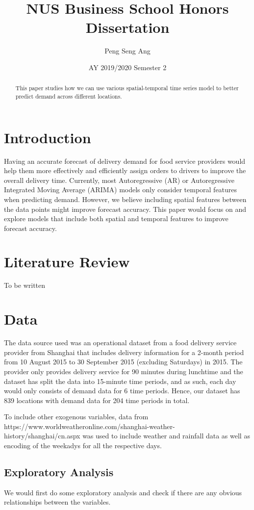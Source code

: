 \documentclass[10pt, letterpaper] {article}
\begin{document}
	\title{NUS Business School Honors Dissertation}
	\author{Peng Seng Ang}
	\date{AY 2019/2020 Semester 2}
	\maketitle
\begin{abstract}
This paper studies how we can use various spatial-temporal time series model to better predict demand across different locations. 
\end{abstract}
\section{Introduction}
Having an accurate forecast of delivery demand for food service providers would help them more effectively and efficiently assign orders to drivers to improve the overall delivery time. Currently, most Autoregressive (AR) or Autoregressive Integrated Moving Average (ARIMA) models only consider temporal features when predicting demand. However, we believe including spatial features between the data points might improve forecast accuracy. This paper would focus on and explore models that include both spatial and temporal features to improve forecast accuracy. 

\section{Literature Review}
To be written

\section{Data}
The data source used was an operational dataset from a food delivery service provider from Shanghai that includes delivery information for a 2-month period from 10 August 2015 to 30 September 2015 (excluding Saturdays) in 2015. The provider only provides delivery service for 90 minutes during lunchtime and the dataset has split the data into 15-minute time periods, and as such, each day would only consists of demand data for 6 time periods. Hence, our dataset has 839 locations with demand data for 204 time periods in total. 

To include other exogenous variables, data from https://www.worldweatheronline.com/shanghai-weather-history/shanghai/cn.aspx was used to include weather and rainfall data as well as encoding of the weekadys for all the respective days. 

\subsection{Exploratory Analysis}
We would first do some exploratory analysis and check if there are any obvious relationships between the variables.
\end{document}
